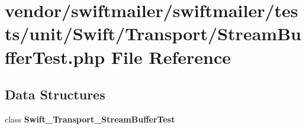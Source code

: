 \section{vendor/swiftmailer/swiftmailer/tests/unit/\+Swift/\+Transport/\+Stream\+Buffer\+Test.php File Reference}
\label{_stream_buffer_test_8php}
\subsection*{Data Structures}
\begin{DoxyCompactItemize}
\item 
class {\bf Swift\+\_\+\+Transport\+\_\+\+Stream\+Buffer\+Test}
\end{DoxyCompactItemize}
